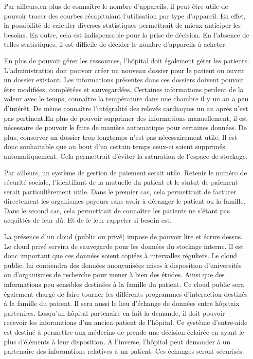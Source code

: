 Par ailleurs,en plus de connaître le nombre d'appareils, il peut être utile de pouvoir tracer des courbes récapitulant
l'utilisation par type d'appareil. En effet, la possibilité de calculer diverses statistiques permettrait de mieux anticiper les
besoins. En outre, cela est indispensable pour la prise de décision. En l'absence de telles statistiques, il est difficile de
décider le nombre d'appareils à acheter.  
\newline

En plus de pouvoir gérer les ressources, l'hôpital doit également gérer les patients. L'administration doit pouvoir créer un
nouveau dossier pour le patient ou ouvrir un dossier existant. Les informations présentes dans ces dossiers doivent pouvoir être
modifiées, complétées et sauvegardées. Certaines informations perdent de la valeur avec le temps, connaître la température dans
une chambre il y un an a peu d'intérêt. De même connaître l'intégralité des relevés cardiaques un an après n'est pas pertinent.En
plus de pouvoir supprimer des informations manuellement, il est nécessaire de pouvoir le faire de manière automatique pour
certaines données. De plus, conserver un dossier trop longtemps n'est pas nécessairement utile. Il est donc souhaitable que au
bout d'un certain temps ceux-ci soient supprimés automatiquement. Cela permettrait d'éviter la saturation de l'espace de stockage.
\newline

Par ailleurs, un système de gestion de paiement serait utile. Retenir le numéro de sécurité sociale, l'identifiant de la mutuelle
du patient et le statut de paiement serait particulièrement utile. Dans le premier cas, cela permettrait de facturer directement
les organismes payeurs sans avoir à déranger le patient ou la famille. Dans le second cas, cela permettrait de connaître les
patients ne s'étant pas acquittés de leur dû. Et de le leur rappeler si besoin est.
\newline

La présence d'un cloud (public ou privé) impose de pouvoir lire et écrire dessus. Le cloud privé servira de sauvegarde pour les
données du stockage interne. Il est donc important que ces données soient copiées à intervalles réguliers. Le cloud public, lui
contiendra des données anonymisées mises à disposition d'universités ou d'organismes de recherche pour mener à bien des études.
Ainsi que des informations peu sensibles destinées à la famille du patient. Ce cloud public sera également chargé de faire tourner
les différents programmes d'interaction destinés à la famille du patient. Il sera aussi le lieu d'échange de données entre
hôpitaix partenires. Losqu'un hôpital partenaire en fait la demande, il doit pouvoir recevoir les inforamtions d'un ancien patient
de l'hôpital. Ce système d'entre-aide est destiné à permettre aux médecins de prende une décision éclairée en ayant le plus
d'éléments à leur disposition. A l'inverse, l'hôpital peut demander à un partenaire des inforamtions relatives à un patient. Ces
échanges seront sécurisés.
\newline

